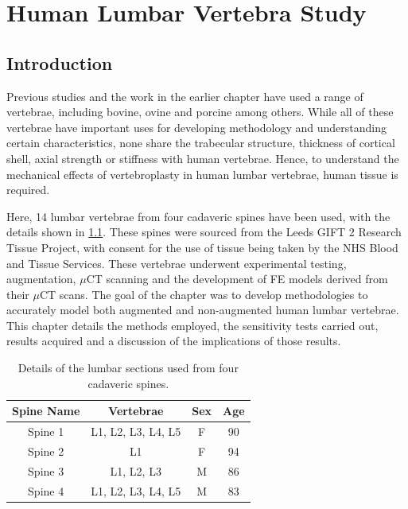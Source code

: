 \chapter{Human Lumbar Vertebra Study} \label{Chapter_HT}

\section{Introduction}

Previous studies and the work in the earlier chapter have used a range of vertebrae, including
bovine, ovine and porcine among others. While all of these vertebrae have
important uses for developing methodology and understanding certain
characteristics, none share the trabecular structure, thickness of cortical
shell, axial strength or stiffness with human vertebrae. Hence, to understand the
mechanical effects of vertebroplasty in human lumbar vertebrae, human tissue is required.

Here, 14 lumbar vertebrae from four cadaveric spines have been used, with the
details shown in \cref{tab:vertebrae}. These spines were sourced from the Leeds GIFT 2 Research Tissue Project, with consent for the use of tissue being taken by the NHS Blood and Tissue Services.
These vertebrae underwent experimental
testing, augmentation, $\mu$CT scanning and the development of FE models
derived from their $\mu$CT scans. The goal of the chapter was to develop
methodologies to accurately model both augmented and non-augmented human lumbar
vertebrae. This chapter details the methods employed, the sensitivity tests
carried out, results acquired and a discussion of the implications of those
results.

\begin{table}[ht!]
\centering
  \caption{Details of the lumbar sections used from four cadaveric spines.}
  \label{tab:vertebrae}
  \begin{tabular}{c|c|c|c}
    Spine Name & Vertebrae & Sex & Age \\ \hline \hline
    Spine 1& L1, L2, L3, L4, L5 & F & 90\\ \hline
    Spine 2& L1 & F & 94\\ \hline
    Spine 3& L1, L2, L3 & M & 86\\ \hline
    Spine 4& L1, L2, L3, L4, L5 & M & 83\\ \hline

  \end{tabular}

\end{table}



